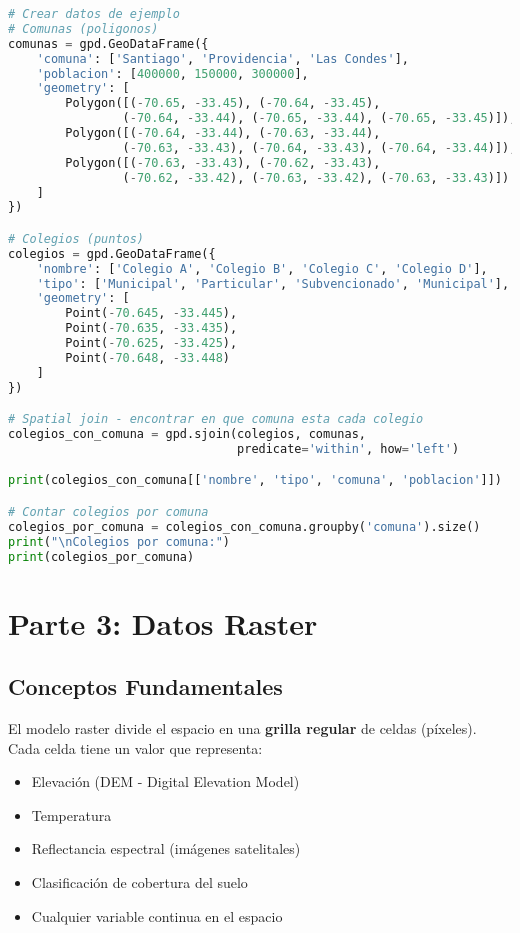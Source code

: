 \documentclass[11pt,a4paper]{article}
\newcommand{\concepto}[2]{\begin{tcolorbox}[colback=blue!5,colframe=usachblue,title={#1}]#2\end{tcolorbox}}
\begin{document}
\begin{lstlisting}[language=Python]
# Crear datos de ejemplo
# Comunas (poligonos)
comunas = gpd.GeoDataFrame({
    'comuna': ['Santiago', 'Providencia', 'Las Condes'],
    'poblacion': [400000, 150000, 300000],
    'geometry': [
        Polygon([(-70.65, -33.45), (-70.64, -33.45), 
                (-70.64, -33.44), (-70.65, -33.44), (-70.65, -33.45)]),
        Polygon([(-70.64, -33.44), (-70.63, -33.44), 
                (-70.63, -33.43), (-70.64, -33.43), (-70.64, -33.44)]),
        Polygon([(-70.63, -33.43), (-70.62, -33.43), 
                (-70.62, -33.42), (-70.63, -33.42), (-70.63, -33.43)])
    ]
})

# Colegios (puntos)
colegios = gpd.GeoDataFrame({
    'nombre': ['Colegio A', 'Colegio B', 'Colegio C', 'Colegio D'],
    'tipo': ['Municipal', 'Particular', 'Subvencionado', 'Municipal'],
    'geometry': [
        Point(-70.645, -33.445),
        Point(-70.635, -33.435),
        Point(-70.625, -33.425),
        Point(-70.648, -33.448)
    ]
})

# Spatial join - encontrar en que comuna esta cada colegio
colegios_con_comuna = gpd.sjoin(colegios, comunas, 
                                predicate='within', how='left')

print(colegios_con_comuna[['nombre', 'tipo', 'comuna', 'poblacion']])

# Contar colegios por comuna
colegios_por_comuna = colegios_con_comuna.groupby('comuna').size()
print("\nColegios por comuna:")
print(colegios_por_comuna)
\end{lstlisting}

\newpage

\section{Parte 3: Datos Raster}

\subsection{Conceptos Fundamentales}

\concepto{Modelo Raster}{
El modelo raster divide el espacio en una \textbf{grilla regular} de celdas (píxeles). Cada celda tiene un valor que representa:
\begin{itemize}
    \item Elevación (DEM - Digital Elevation Model)
    \item Temperatura
    \item Reflectancia espectral (imágenes satelitales)
    \item Clasificación de cobertura del suelo
    \item Cualquier variable continua en el espacio
\end{itemize}
}
\end{document}
